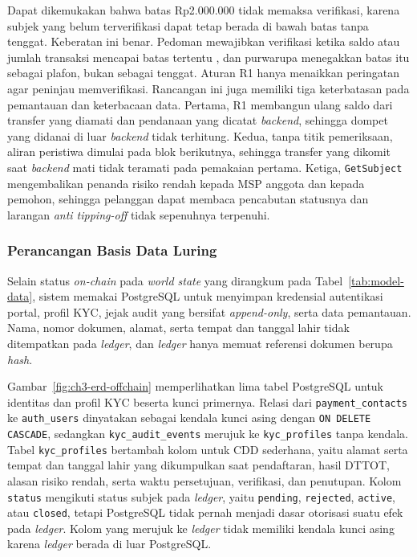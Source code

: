 Dapat dikemukakan bahwa batas Rp2.000.000 tidak memaksa verifikasi, karena subjek yang belum terverifikasi dapat tetap berada di bawah batas tanpa tenggat. Keberatan ini benar. Pedoman mewajibkan verifikasi ketika saldo atau jumlah transaksi mencapai batas tertentu \cite[hlm.~38]{bi2023pedoman}, dan purwarupa menegakkan batas itu sebagai plafon, bukan sebagai tenggat. Aturan R1 hanya menaikkan peringatan agar peninjau memverifikasi. Rancangan ini juga memiliki tiga keterbatasan pada pemantauan dan keterbacaan data. Pertama, R1 membangun ulang saldo dari transfer yang diamati dan pendanaan yang dicatat \textit{backend}, sehingga dompet yang didanai di luar \textit{backend} tidak terhitung. Kedua, tanpa titik pemeriksaan, aliran peristiwa dimulai pada blok berikutnya, sehingga transfer yang dikomit saat \textit{backend} mati tidak teramati pada pemakaian pertama. Ketiga, \texttt{GetSubject} mengembalikan penanda risiko rendah kepada MSP anggota dan kepada pemohon, sehingga pelanggan dapat membaca pencabutan statusnya dan larangan \textit{anti tipping-off} tidak sepenuhnya terpenuhi.

\subsubsection{Perancangan Basis Data Luring}

Selain status \textit{on-chain} pada \textit{world state} yang dirangkum pada
Tabel~\ref{tab:model-data}, sistem memakai PostgreSQL untuk menyimpan kredensial
autentikasi portal, profil KYC, jejak audit yang bersifat \textit{append-only},
serta data pemantauan. Nama, nomor dokumen, alamat, serta tempat dan tanggal lahir
tidak ditempatkan pada \textit{ledger}, dan \textit{ledger} hanya memuat referensi
dokumen berupa \textit{hash}.

Gambar~\ref{fig:ch3-erd-offchain} memperlihatkan lima tabel PostgreSQL untuk identitas dan profil KYC beserta kunci primernya. Relasi dari \texttt{payment\_contacts} ke \texttt{auth\_users} dinyatakan sebagai kendala kunci asing dengan \texttt{ON DELETE CASCADE}, sedangkan \texttt{kyc\_audit\_events} merujuk ke \texttt{kyc\_profiles} tanpa kendala. Tabel \texttt{kyc\_profiles} bertambah kolom untuk CDD sederhana, yaitu alamat serta tempat dan tanggal lahir yang dikumpulkan saat pendaftaran, hasil DTTOT, alasan risiko rendah, serta waktu persetujuan, verifikasi, dan penutupan. Kolom \texttt{status} mengikuti status subjek pada \textit{ledger}, yaitu \texttt{pending}, \texttt{rejected}, \texttt{active}, atau \texttt{closed}, tetapi PostgreSQL tidak pernah menjadi dasar otorisasi suatu efek pada \textit{ledger}. Kolom yang merujuk ke \textit{ledger} tidak memiliki kendala kunci asing karena \textit{ledger} berada di luar PostgreSQL.

